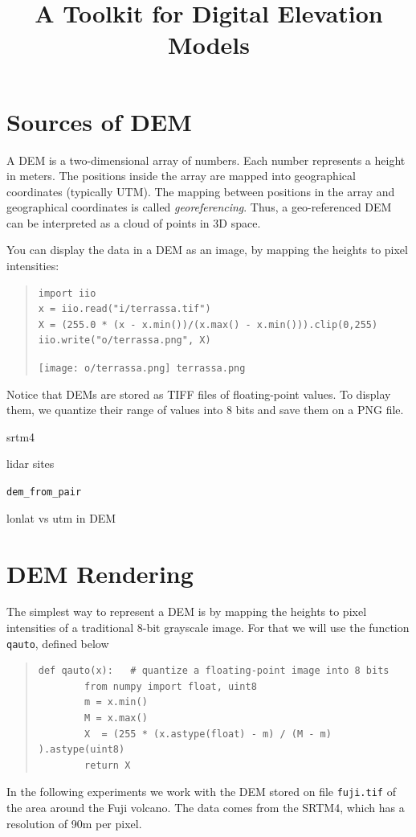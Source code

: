 \title{A Toolkit for Digital Elevation Models}

\section{Sources of DEM}


A DEM is a two-dimensional array of numbers.  Each number
represents a height in meters.  The positions inside the array are mapped into
geographical coordinates (typically UTM).  The mapping between positions in
the array and geographical coordinates is called \emph{georeferencing}.
Thus, a geo-referenced DEM can be interpreted as a cloud of points in 3D
space.

You can display the data in a DEM as an image, by mapping the heights to
pixel intensities:

\begin{quote}
\begin{verbatim}
import iio
x = iio.read("i/terrassa.tif")
X = (255.0 * (x - x.min())/(x.max() - x.min())).clip(0,255)
iio.write("o/terrassa.png", X)
\end{verbatim}
\texttt{[image: o/terrassa.png]}~\verb+terrassa.png+
\end{quote}

Notice that DEMs are stored as TIFF files of floating-point values.  To
display them, we quantize their range of values into 8 bits and save them on
a PNG file.




srtm4

lidar sites


\verb+dem_from_pair+

lonlat vs utm in DEM


\clearpage
\section{DEM Rendering}


The simplest way to represent a DEM is by mapping the heights to pixel
intensities of a traditional 8-bit grayscale image.
For that we will use the function \verb+qauto+, defined below
\begin{quote}
\begin{verbatim}
def qauto(x):   # quantize a floating-point image into 8 bits
        from numpy import float, uint8
        m = x.min()
        M = x.max()
        X  = (255 * (x.astype(float) - m) / (M - m) ).astype(uint8)
        return X
\end{verbatim}
\end{quote}
In the following experiments we work with the DEM stored on file
\verb+fuji.tif+ of the area around the Fuji volcano.  The data comes from
the SRTM4, which has a resolution of 90m per pixel.

